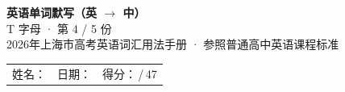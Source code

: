\documentclass[10pt,a4paper]{article}
\begin{document}
\pagestyle{plain}

\begin{center}
{\LARGE\bfseries 英语单词默写（英 $\to$ 中）}\\[0.22em]
{\large T 字母 · 第 4 / 5 份}\\[0.18em]
{\small 2026年上海市高考英语词汇用法手册 · 参照普通高中英语课程标准}
\end{center}

\vspace{0.25em}
\noindent\begin{tabular}{@{}p{}@{}p{}@{}p{}@{}}
姓名：\underline{\hspace{2.0cm}} & 日期：\underline{\hspace{2.0cm}} & 得分：\underline{\hspace{1.3cm}}\,/\,47 \\
\end{tabular}

\vspace{0.3em}

\vspace{0.08em}
\end{document}

